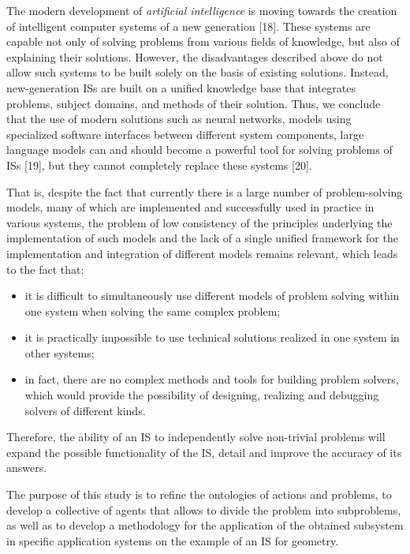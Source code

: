 \documentclass [11pt, a4paper]{article}
\begin{document}
\begin{multicols}{2}
\begin{itemize}
\end{itemize}
\par \quad The modern development of \textit{artificial intelligence} is
moving towards the creation of intelligent computer
systems of a new generation [18]. These systems are
capable not only of solving problems from various fields
of knowledge, but also of explaining their solutions.
However, the disadvantages described above do not allow such systems to be built solely on the basis of
existing solutions. Instead, new-generation ISs are built
on a unified knowledge base that integrates problems,
subject domains, and methods of their solution. Thus,
we conclude that the use of modern solutions such
as neural networks, models using specialized software
interfaces between different system components, large
language models can and should become a powerful
tool for solving problems of ISs [19], but they cannot
completely replace these systems [20].
\par \quad That is, despite the fact that currently there is a large
number of problem-solving models, many of which are
implemented and successfully used in practice in various
systems, the problem of low consistency of the principles
underlying the implementation of such models and the
lack of a single unified framework for the implementation
and integration of different models remains relevant,
which leads to the fact that:
\begin{itemize}
    \item it is difficult to simultaneously use different models
of problem solving within one system when solving
the same complex problem;
    \item it is practically impossible to use technical solutions
realized in one system in other systems;
    \item in fact, there are no complex methods and tools
for building problem solvers, which would provide
the possibility of designing, realizing and debugging
solvers of different kinds.
\end{itemize}
\par \quad Therefore, the ability of an IS to independently solve
non-trivial problems will expand the possible functionality of the IS, detail and improve the accuracy of its
answers.
\par \quad The purpose of this study is to refine the ontologies of
actions and problems, to develop a collective of agents
that allows to divide the problem into subproblems, as
well as to develop a methodology for the application of
the obtained subsystem in specific application systems
on the example of an IS for geometry.
\end{multicols}
\end{document}
